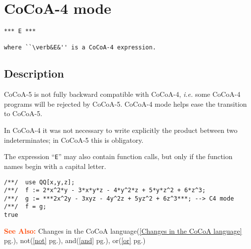 \documentclass[a4paper]{mybook}
\newenvironment{command}{}{} %
\newcommand\SeeAlso{\par\textcolor{OrangeRed}{\textbf{\large See Also: }}}
\begin{document}
\section{CoCoA-4 mode}
\label{CoCoA-4 mode}
\begin{command} %


\begin{Verbatim}[label=syntax, rulecolor=\color{MidnightBlue},
frame=single]
  *** E ***

where ``\verb&E&'' is a CoCoA-4 expression.
\end{Verbatim}


\subsection*{Description}

CoCoA-5 is not fully backward compatible with CoCoA-4, \textit{i.e.} some
CoCoA-4 programs will be rejected by CoCoA-5.  CoCoA-4 mode helps ease
the transition to CoCoA-5.
\par 
In CoCoA-4 it was not necessary to write explicitly the product between
two indeterminates; in CoCoA-5 this is obligatory.
\par 
The expression ``\verb&E&'' may also contain function calls, but only if the
function names begin with a capital letter.
\begin{Verbatim}[label=example, rulecolor=\color{PineGreen}, frame=single]
/**/  use QQ[x,y,z];
/**/  f := 2*x^2*y - 3*x*y*z - 4*y^2*z + 5*y*z^2 + 6*z^3;
/**/  g := ***2x^2y - 3xyz - 4y^2z + 5yz^2 + 6z^3***; --> C4 mode
/**/  f = g;
true
\end{Verbatim}


\SeeAlso %
  Changes in the CoCoA language(\ref{Changes in the CoCoA language} pg.\pageref{Changes in the CoCoA language}), 
    not(\ref{not} pg.\pageref{not}), 
    and(\ref{and} pg.\pageref{and}), 
    or(\ref{or} pg.\pageref{or})
\end{command} %
\end{document}

